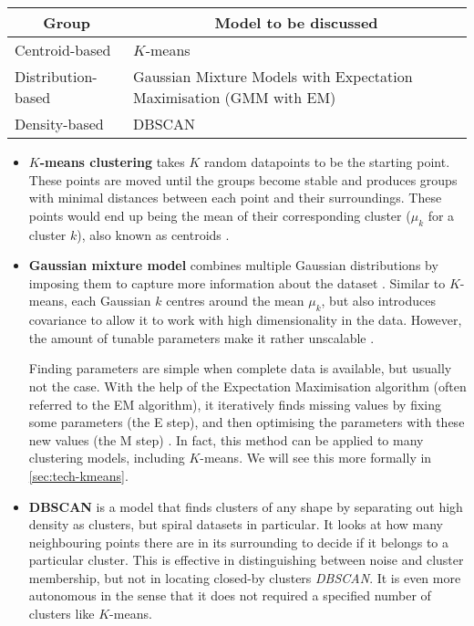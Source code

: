 \parbox{\linewidth}{
  \centering
  \begin{tabularx}{0.8\textwidth}{|l|X|}
    \hline
    \multicolumn{1}{|c|}{\textbf{Group}} & \multicolumn{1}{c|}{\textbf{Model to be discussed}}
    \\\hline
    Centroid-based & $K$-means 
    \\\hline
    Distribution-based & Gaussian Mixture Models with Expectation Maximisation (GMM with EM)
    \\\hline
    Density-based & DBSCAN
    \\\hline
  \end{tabularx}

  \label{tab:unsupervised-discuss}
}

\begin{itemize}

  \item \textbf{$K$-means clustering} takes $K$ random datapoints to be the starting point. These points are moved until the groups become stable and produces groups with minimal distances between each point and their surroundings. These points would end up being the mean of their corresponding cluster ($\mu_k$ for a cluster $k$), also known as centroids \cite{bishop-book}.

  \item \textbf{Gaussian mixture model} combines multiple Gaussian distributions by imposing them to capture more information about the dataset \cite{bishop-book}. Similar to $K$-means, each Gaussian $k$ centres around the mean $\mu_k$, but also introduces covariance to allow it to work with high dimensionality in the data. However, the amount of tunable parameters make it rather unscalable \cite{scikit-docs}.

Finding parameters are simple when complete data is available, but usually not the case. With the help of the Expectation Maximisation algorithm (often referred to the EM algorithm), it iteratively finds missing values by fixing some parameters (the E step), and then optimising the parameters with these new values (the M step) \cite{mur-book}. In fact, this method can be applied to many clustering models, including $K$-means. We will see this more formally in \autoref{sec:tech-kmeans}.

  \item \textbf{DBSCAN} is a model that finds clusters of any shape by separating out high density as clusters, but spiral datasets in particular. It looks at how many neighbouring points there are in its surrounding to decide if it belongs to a particular cluster. This is effective in distinguishing between noise and cluster membership, but not in locating closed-by clusters \textit{DBSCAN}. It is even more autonomous in the sense that it does not required a specified number of clusters like $K$-means.
\end{itemize}



